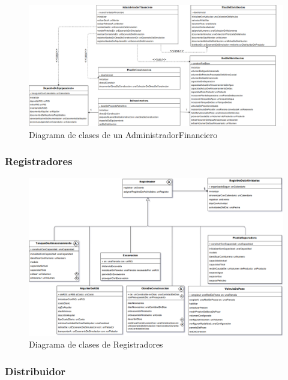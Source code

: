 \documentclass[10pt,a3paper, ,landscape]{article}
\begin{document}
\begin{figure}[H]
\centerline{\includegraphics[scale=0.38]{images/DiagramaDeClases_deAdministradorFinanciero.png}}
\caption{Diagrama de clases de un AdministradorFinanciero}
\end{figure}

\subsubsection{Registradores}
  
\begin{figure}[H]
\centerline{\includegraphics[scale=0.8]{images/DiagramaDeClases_deRegistrador.png}}
\caption{Diagrama de clases de Registradores}
\end{figure}

\pagebreak

\subsubsection{Distribuidor}
\end{document}
